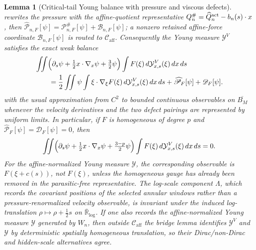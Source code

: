 \documentclass[11pt]{amsart}
\numberwithin{equation}{section}
\theoremstyle{plain}
\newtheorem{lemma}[lemma]{Lemma}
\theoremstyle{definition}
\theoremstyle{remark}
\newcommand{\Caff}{\mathcal C_{\mathrm{aff}}}
\begin{document}
\begin{lemma}[Critical-tail Young balance with pressure and viscous defects]
rewrites the pressure with the affine-quotient representative
\(Q_n^\#=\widehat Q_n^{\rm act}-b_n(s)\cdot x\), then
\(\widehat{\mathscr P}_{n,F}[\psi]=\mathscr P^\#_{n,F}[\psi]+
\mathscr B_{n,F}[\psi]\); a nonzero retained affine-force coordinate
\(\mathscr B_{n,F}[\psi]\) is routed to \(\Caff\).  Consequently the Young
measure \(\mathcal Y^V\) satisfies the exact weak
balance
\begin{equation}\label{eq:young-transport-identity}
\begin{aligned}
   &\iint
   \Bigl(\partial_s\psi+\tfrac12 x\cdot\nabla_x\psi+\tfrac32\psi\Bigr)
   \int F(\xi)\,d\mathcal Y^V_{x,s}(\xi)\,dx\,ds\\
   &\qquad =
   \frac12\iint \psi
   \int \xi\cdot\nabla_\xi F(\xi)\,d\mathcal Y^V_{x,s}(\xi)\,dx\,ds
   +\widehat{\mathscr P}_F[\psi]+\mathscr D_F[\psi].
\end{aligned}
\end{equation}
with the usual approximation from \(C^2\) to bounded continuous observables on
\(\overline{B_M}\) whenever the velocity derivatives and the two defect
pairings are represented by uniform limits.  In particular, if \(F\) is
homogeneous of degree \(p\) and
\(\widehat{\mathscr P}_F[\psi]=\mathscr D_F[\psi]=0\), then
\[
   \iint
   \Bigl(\partial_s\psi+\tfrac12x\cdot\nabla_x\psi
      +\tfrac{3-p}{2}\psi\Bigr)
   \int F(\xi)\,d\mathcal Y^V_{x,s}(\xi)\,dx\,ds=0 .
\]
For the affine-normalized Young measure \(\mathcal Y\), the corresponding
observable is \(F(\xi+c(s))\), not \(F(\xi)\), unless the homogeneous gauge has
already been removed in the parasitic-free representative.
The log-scale component \(\Lambda\), which records the covariant positions of
the selected annular windows rather than a pressure-renormalized velocity
observable, is invariant under the induced log-translation
\(\rho\mapsto\rho+\tfrac12 s\) on \(\overline{\mathbb R}_{\log}\).  If one
also records the affine-normalized Young measure \(\mathcal Y\) generated by
\(W_n\), then outside \(\Caff\) the bridge lemma
 identifies \(\mathcal Y^V\)
and \(\mathcal Y\) by deterministic spatially homogeneous translation, so their
Dirac/non-Dirac and hidden-scale alternatives agree.
\end{lemma}
\end{document}
